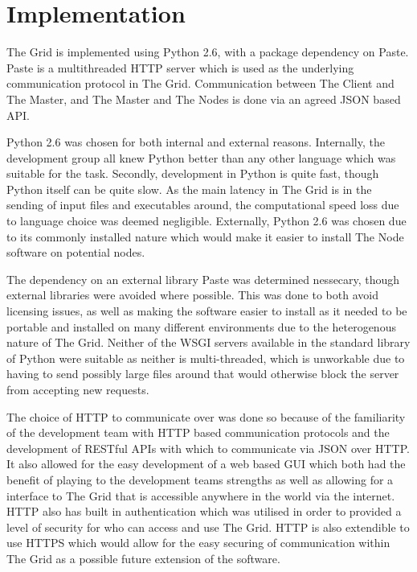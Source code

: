 \chapter{Implementation}
\label{implementation}

The Grid is implemented using Python 2.6, with a package dependency on Paste. Paste is a multithreaded HTTP server which is used as the underlying communication protocol in The Grid. Communication between The Client and The Master, and The Master and The Nodes is done via an agreed JSON based API. 

Python 2.6 was chosen for both internal and external reasons. Internally, the development group all knew Python better than any other language which was suitable for the task. Secondly, development in Python is quite fast, though Python itself can be quite slow. As the main latency in The Grid is in the sending of input files and executables around, the computational speed loss due to language choice was deemed negligible. Externally, Python 2.6 was chosen due to its commonly installed nature which would make it easier to install The Node software on potential nodes. 

The dependency on an external library Paste was determined nessecary, though external libraries were avoided where possible. This was done to both avoid licensing issues, as well as making the software easier to install as it needed to be portable and installed on many different environments due to the heterogenous nature of The Grid. Neither of the WSGI servers available in the standard library of Python were suitable as neither is multi-threaded, which is unworkable due to having to send possibly large files around that would otherwise block the server from accepting new requests.

The choice of HTTP to communicate over was done so because of the familiarity of the development team with HTTP based communication protocols and the development of RESTful APIs with which to communicate via JSON over HTTP. It also allowed for the easy development of a web based GUI which both had the benefit of playing to the development teams strengths as well as allowing for a interface to The Grid that is accessible anywhere in the world via the internet. HTTP also has built in authentication which was utilised in order to provided a level of security for who can access and use The Grid. HTTP is also extendible to use HTTPS which would allow for the easy securing of communication within The Grid as a possible future extension of the software.

